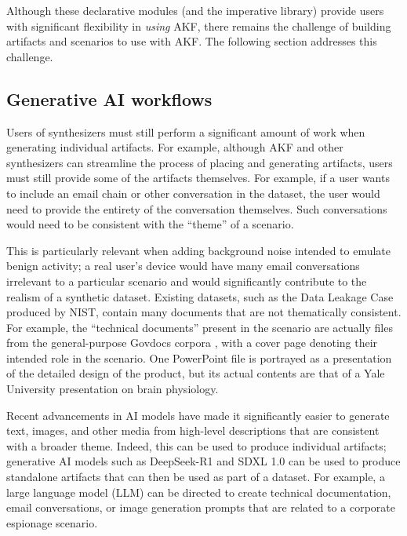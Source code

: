 \documentclass[final,5p,times,twocolumn]{elsarticle}
\begin{document}
Although these declarative modules (and the imperative library) provide
users with significant flexibility in \emph{using} AKF, there remains
the challenge of building artifacts and scenarios to use with AKF. The
following section addresses this challenge.

\subsection{Generative AI workflows}\label{generative-ai-workflows}

Users of synthesizers must still perform a significant amount of work
when generating individual artifacts. For example, although AKF and
other synthesizers can streamline the process of placing and generating
artifacts, users must still provide some of the artifacts themselves.
For example, if a user wants to include an email chain or other
conversation in the dataset, the user would need to provide the entirety
of the conversation themselves. Such conversations would need to be
consistent with the ``theme'' of a scenario.

This is particularly relevant when adding background noise intended to
emulate benign activity; a real user's device would have many email
conversations irrelevant to a particular scenario and would
significantly contribute to the realism of a synthetic dataset. Existing
datasets, such as the Data Leakage Case produced by NIST, contain many
documents that are not thematically consistent. For example, the
``technical documents'' present in the scenario are actually files from
the general-purpose Govdocs corpora
\cite{garfinkelBringingScienceDigital2009}, with a cover page
denoting their intended role in the scenario. One PowerPoint file is
portrayed as a presentation of the detailed design of the product, but
its actual contents are that of a Yale University presentation on brain
physiology.

Recent advancements in AI models have made it significantly easier to
generate text, images, and other media from high-level descriptions that
are consistent with a broader theme. Indeed, this can be used to produce
individual artifacts; generative AI models such as DeepSeek-R1
\cite{deepseek-aiDeepSeekR1IncentivizingReasoning2025} and SDXL 1.0
\cite{podellSDXLImprovingLatent2023} can be used to produce
standalone artifacts that can then be used as part of a dataset. For
example, a large language model (LLM) can be directed to create
technical documentation, email conversations, or image generation
prompts that are related to a corporate espionage scenario.
\end{document}
